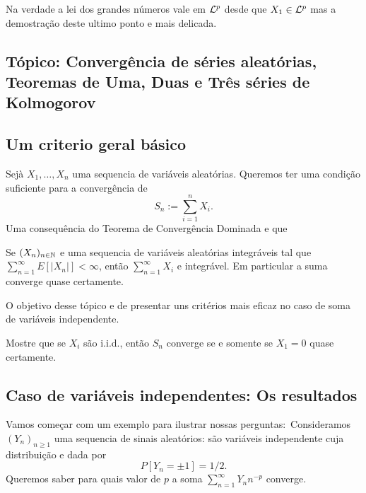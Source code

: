 \begin{remark}
 Na verdade a lei dos grandes números vale em ${\mathcal L}^p$ desde que $X_1\in {\ensuremath{\mathcal L}}^p$ mas a demostração deste ultimo ponto e mais delicada.
\end{remark}

\newpage
\begin{topics}
  \section[Tópico: Séries de Kolmogorov]
  {Tópico: Convergência de séries aleatórias,\\
Teoremas de Uma, Duas e Três séries de Kolmogorov}

\subsection{Um criterio geral básico}

Sejà $X_1,\dots, X_n$ uma sequencia de variáveis aleatórias.
Queremos ter uma condição suficiente para a convergência de
\begin{equation}
S_n:= \sum_{i=1}^n X_i.
\end{equation}
Uma consequência do Teorema de Convergência Dominada e que
\begin{lemma}
 Se $(X_n)_{n\in {\ensuremath{\mathbb N}}}$ e uma sequencia de variáveis aleatórias integráveis tal que
 $\sum_{n=1}^{\infty} E[ |X_n| ]<\infty$,
então $\sum_{n=1}^{\infty} X_i$ e integrável.
Em particular a suma converge quase certamente.
\end{lemma}

O objetivo desse tópico e de presentar uns critérios mais eficaz no caso de soma de variáveis independente.

\begin{exercise}
  Mostre que se $X_i$ são i.i.d., então $S_n$ converge se e somente se $X_1 = 0$ quase certamente.
\end{exercise}

\medskip

\subsection{Caso de variáveis independentes: Os resultados}

Vamos começar com um exemplo para ilustrar nossas perguntas:\
Consideramos $(Y_n)_{n\ge 1}$ uma sequencia de sinais aleatórios: são variáveis independente cuja distribuição e dada por
$$P[Y_n=\pm 1]=1/2.$$
Queremos saber para quais valor de $p$ a soma $\sum_{n=1}^{\infty} Y_n n^{-p}$ converge.


\end{topics}
